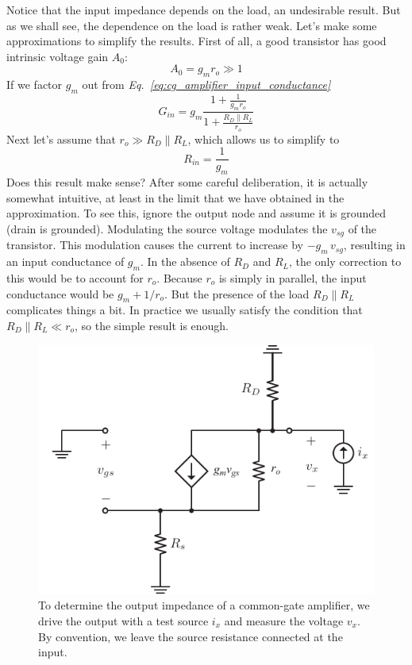 Notice that the input impedance depends on the load, an undesirable result.  But as we shall see, the dependence on the load is rather weak.  Let's make some approximations to simplify the results.  First of all, a good transistor has good intrinsic voltage gain $A_0$: 
    \begin{equation}
        A_0 = g_m r_o \gg 1
    \end{equation}
If we factor $g_m$ out from \emph{Eq.~\ref{eq:cg_amplifier_input_conductance}}
    \begin{equation}
        G_{in} = g_m \frac{{1 + \frac{1}{{{g_m r_o}}}}}{{1 + \frac{{{R_D}\parallel{R_L}}}{{{r_o}}}}}
    \end{equation}
Next let's assume that $r_o \gg R_D \parallel R_L$, which allows us to simplify to
    \begin{equation}
        {R_{in}} = \frac{1}{{{g_m}}}
    \end{equation}
Does this result make sense?  After some careful deliberation, it is actually somewhat intuitive, at least in the limit that we have obtained in the approximation.  To see this, ignore the output node and assume it is grounded (drain is grounded). Modulating the source voltage modulates the $v_{sg}$ of the transistor.  This modulation causes the current to increase by $-g_m\,v_{sg}$, resulting in an input conductance of $g_m$.  In the absence of $R_D$ and $R_L$, the only correction to this would be to account for $r_o$.  Because $r_o$ is simply in parallel, the input conductance would be $g_m + 1/r_o$.  But the presence of the load $R_D \parallel R_L$ complicates things a bit.  In practice we usually satisfy the condition that $R_D \parallel R_L \ll r_o$, so the simple result is enough. 
\begin{figure}[t]
\centering
\includegraphics[scale=1.15]{cgamp_is_ac_ss_rout}
\caption{To determine the output impedance of a common-gate amplifier, we drive the output with a test source $i_x$ and measure the voltage $v_x$.  By convention, we leave the source resistance connected at the input.}
\label{fig:cgamp_is_ac_ss_rout}
\end{figure}

